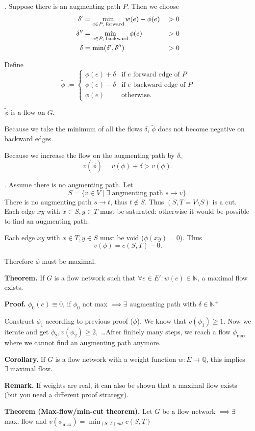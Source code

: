 \ProofForward.
Suppose there is an augmenting path $P$. Then we choose
\begin{alignat*}{3}
    \delta' &= \min_{e \in P,\text{ forward}} w(e) - \phi(e) &\null> 0 \\
    \delta'' &= \min_{e\in P,\text{ backward}} \phi(e) &\null> 0 \\
    \delta &= \min(\delta', \delta'') &> 0
\end{alignat*}

Define
\[
    \tilde\phi := \begin{cases}
        \phi(e) + \delta &\text{if $e$ forward edge of $P$} \\
        \phi(e) - \delta &\text{if $e$ backward edge of $P$} \\
        \phi(e) &\text{otherwise}.
    \end{cases}
\]

$\tilde\phi$ is a flow on $G$.

Because we take the minimum of all the flows $\delta$, $\tilde\phi$ does not become negative on backward edges.

Because we increase the flow on the augmenting path by $\delta$,
\[
    v(\tilde\phi) = v(\phi) + \delta > v(\phi).
\]

\ProofBackward.
Assume there is no augmenting path. Let
\[
    S = \{v\in V \mid \exists\;\text{augmenting path $s\rightarrow v$}\}.
\]
There is no augmenting path $s\rightarrow t$, thus $t \notin S$.
Thus $(S, T = V\setminus S)$ is a cut.
Each edge $xy$ with $x\in S, y\in T$ must be saturated: otherwise it would be possible to find an augmenting path.



Each edge $xy$ with $x\in T, y\in S$ must be void ($\phi(xy) = 0$). Thus
\[
    v(\phi) = c(S,T) - 0.
\]

Therefore $\phi$ must be maximal.

\textbf{Theorem.} If $G$ is a flow network such that $\forall e\in E': w(e)\in
\mathbb{N}$, a maximal flow exists.

\textbf{Proof.} $ \phi_{0}(e) \equiv 0$, if $\phi_{0}$ not max $\implies \exists$ augmenting path with $\delta \in \mathbb{N^{+}}$

Construct $\phi_1$ according to previous proof ($\tilde\phi$). We know that $v(\phi_1) ≥ 1$. Now we iterate and get $\phi_2, v(\phi_2) ≥ 2$,~\ldots After finitely many steps, we reach a flow $\phi_{\text{max}}$ where we cannot find an augmenting path anymore.

\textbf{Corollary.} If $G$ is a flow network with a weight function $w: E\mapsto \mathbb{Q}$, this implies $\exists\;\text{maximal flow}$.

\textbf{Remark.}
If weights are real, it can also be shown that a maximal flow exists (but you need a different proof strategy).

\textbf{Theorem (Max-flow/min-cut theorem).}
Let $G$ be a flow network $\implies \exists$ max. flow and $v(\phi_{\text{max}})= \min_{(S,T) cut} c(S,T)$

